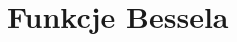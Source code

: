 \documentclass[a4paper,11pt]{article}
\numberwithin{equation}{section}
\begin{document}

















\section{Funkcje Bessela}

\label{sec:Funkcje-Bessela}
\end{document}
